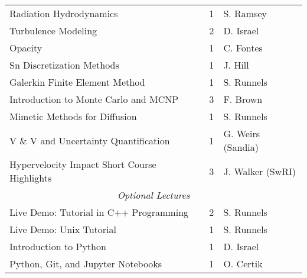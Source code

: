 \begin{small}
\begin{center}
\begin{tabular}{ |  l | c | l |  }
Radiation Hydrodynamics                                                    &    1              &  S. Ramsey                      \\ 
Turbulence Modeling                                                        &    2              &  D. Israel                      \\ 
Opacity                                                                    &    1              &  C. Fontes                      \\ 
Sn Discretization Methods                                                  &    1              &  J. Hill                        \\ 
Galerkin Finite Element Method                                             &    1              &  S. Runnels                     \\ 
Introduction to Monte Carlo and MCNP                                       &    3              &  F. Brown                       \\ 
Mimetic Methods for Diffusion                                              &    1              &  S. Runnels                     \\ 
V \& V and Uncertainty Quantification                                      &    1              &  G. Weirs (Sandia)              \\ 
Hypervelocity Impact Short Course Highlights                               &    3              &  J. Walker (SwRI)               \\ \hline
\multicolumn{3}{|c|}{\em{Optional Lectures}} \\ \hline
Live Demo: Tutorial in C++ Programming                                     &    2              &  S. Runnels                     \\ 
Live Demo: Unix Tutorial                                                   &    1              &  S. Runnels                     \\ 
Introduction to Python                                                     &    1              &  D. Israel                      \\ 
Python, Git, and Jupyter Notebooks                                         &    1              &  O. Certik                      \\  \hline
  \end{tabular}
\end{center}
\end{small}

%
%
